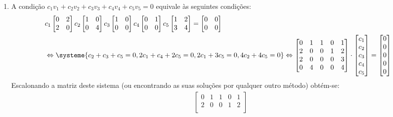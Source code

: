 \documentclass[12pt,a4paper]{article}
\begin{document}
\begin{enumerate}
\begin{enumerate}
\item A condição $c_1 v_1 + c_2 v_2 + c_3 v_3 + c_4 v_4 + c_5 v_5 = 0$ equivale às seguintes condições:
\begin{align*}
& c_1
\begin{bmatrix}
0 & 2 \\
2 & 0
\end{bmatrix}
c_2
\begin{bmatrix}
1 & 0 \\
0 & 4
\end{bmatrix}
c_3
\begin{bmatrix}
1 & 0 \\
0 & 0
\end{bmatrix}
c_4
\begin{bmatrix}
0 & 1 \\
0 & 0
\end{bmatrix}
c_5
\begin{bmatrix}
1 & 2 \\
3 & 4
\end{bmatrix}
=\begin{bmatrix}
0 & 0 \\
0 & 0
\end{bmatrix} \\
&
\Leftrightarrow
\systeme{
c_2+c_3+c_5=0,
2c_1+c_4+2c_5=0,
2c_1+3c_5=0,
4c_2+4c_5=0
}
\Leftrightarrow
\begin{bmatrix}
0 & 1 & 1 & 0 & 1 \\
2 & 0 & 0 & 1 & 2 \\
2 & 0 & 0 & 0 & 3 \\
0 & 4 & 0 & 0 & 4
\end{bmatrix}
\cdot
\begin{bmatrix}
c_1\\
c_2\\
c_3\\
c_4\\
c_5
\end{bmatrix}
=
\begin{bmatrix}
0\\
0\\
0\\
0\\
0
\end{bmatrix}
\end{align*}
Escalonando a matriz deste sistema (ou encontrando as suas soluções por qualquer outro método) obtém-se:
\begin{align*}
& \begin{bmatrix}
0 & 1 & 1 & 0 & 1 \\
2 & 0 & 0 & 1 & 2 \\

\end{bmatrix}
\end{align*}
\end{enumerate}
\end{enumerate}
\end{document}
